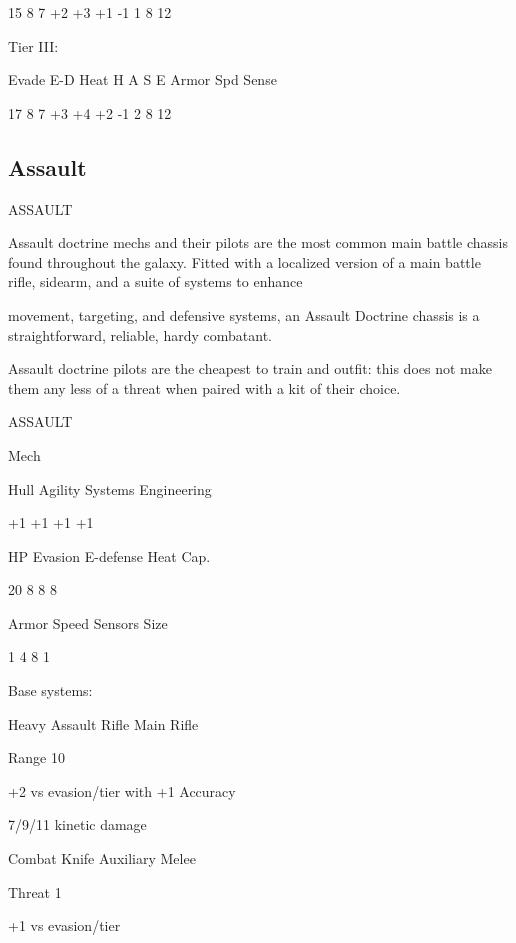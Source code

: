           15       8       7       +2   +3    +1    -1      1            8         12 

                                                                                                                


Tier III:
 

         Evade     E-D   Heat    H    A     S     E      Armor        Spd      Sense 

          17       8     7       +3   +4    +2   -1      2            8        12 

\subsection{Assault}
                                                ASSAULT  

Assault doctrine mechs and their pilots are the most common main battle chassis found throughout the  
galaxy. Fitted with a localized version of a main battle rifle, sidearm, and a suite of systems to enhance  

movement, targeting, and defensive systems, an Assault Doctrine chassis is a straightforward, reliable,  
hardy combatant.   

Assault doctrine pilots are the cheapest to train and outfit: this does not make them any less of a threat  
when paired with a kit of their choice.   

       ASSAULT 

       Mech 

       Hull       Agility      Systems       Engineering 

       +1         +1           +1            +1 

       HP         Evasion      E-defense     Heat Cap. 

       20         8            8             8 

       Armor      Speed        Sensors       Size 

       1          4            8             1 

Base systems:
 
Heavy Assault Rifle  
Main Rifle
 
Range 10
 
+2 vs evasion/tier with +1 Accuracy
 
7/9/11 kinetic damage
 

Combat Knife  
Auxiliary Melee
 
Threat 1
 
+1 vs evasion/tier
 
